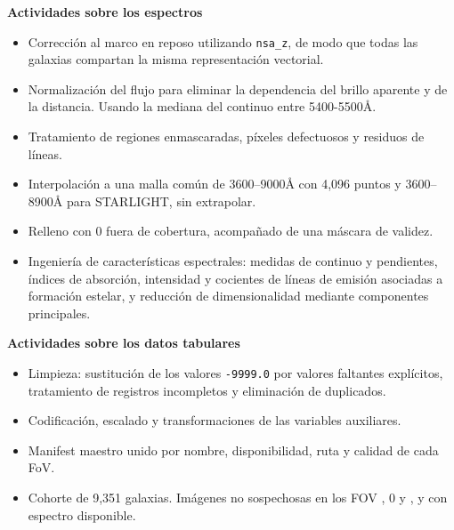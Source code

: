 \textbf{Actividades sobre los espectros}

\begin{itemize}

    \item Corrección al marco en reposo utilizando \texttt{nsa\_z}, de modo que todas las galaxias compartan la misma representación vectorial.

    \item Normalización del flujo para eliminar la dependencia del brillo aparente y de la distancia. Usando la mediana del continuo entre 5400-5500Å.

    \item Tratamiento de regiones enmascaradas, píxeles defectuosos y residuos de líneas.

    \item Interpolación a una malla común de 3600–9000Å con 4,096 puntos y 3600–8900Å para STARLIGHT, sin extrapolar.

    \item Relleno con 0 fuera de cobertura, acompañado de una máscara de validez.

    \item Ingeniería de características espectrales: medidas de continuo y pendientes, índices de absorción, intensidad y cocientes de líneas de emisión asociadas a formación estelar, y reducción de dimensionalidad mediante componentes principales.

\end{itemize}

\textbf{Actividades sobre los datos tabulares }

\begin{itemize}

    \item Limpieza: sustitución de los valores \texttt{-9999.0} por valores faltantes explícitos, tratamiento de registros incompletos y eliminación de duplicados.

    \item Codificación, escalado y transformaciones de las variables auxiliares.

    \item Manifest maestro unido por nombre, disponibilidad, ruta y calidad de cada FoV.

    \item Cohorte de 9,351 galaxias. Imágenes no sospechosas en los FOV , 0 y , y con espectro disponible.

\end{itemize}

